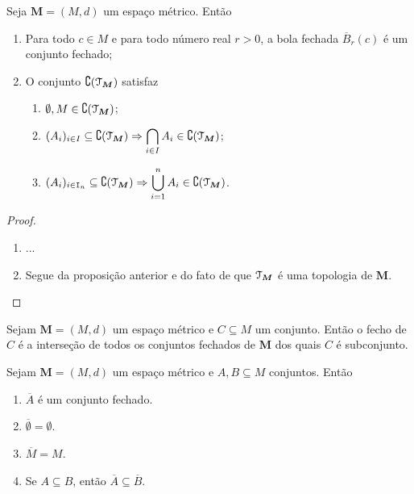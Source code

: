 \begin{prop}
	Seja $\bm M = (M,d)$ um espaço métrico. Então
	\begin{enumerate}
	\item Para todo $c \in M$ e para todo número real $r > 0$, a bola fechada $\overline B_r(c)$ é um conjunto fechado;
	\item O conjunto $\complement(\mathcal{T}_{\bm M})$ satisfaz
		\begin{enumerate}
			\item $\emptyset,M \in \complement(\mathcal{T}_{\bm M})$;
			\item $(A_i)_{i \in I} \subseteq \complement(\mathcal{T}_{\bm M}) \Rightarrow \displaystyle\bigcap_{i \in I} A_i \in \complement(\mathcal{T}_{\bm M})$;
			\item $(A_i)_{i \in \mathtt I_n} \subseteq \complement(\mathcal{T}_{\bm M}) \Rightarrow \displaystyle\bigcup_{i=1}^n A_i \in \complement(\mathcal{T}_{\bm M})$.
		\end{enumerate}
	\end{enumerate}
\end{prop}
\begin{proof}
	\begin{enumerate}
	\item ...
	
	\item Segue da proposição anterior e do fato de que $\mathcal{T}_{\bm M}$ é uma topologia de $\bm M$.
	\end{enumerate}
\end{proof}

\begin{prop}
	Sejam $\bm M = (M,d)$ um espaço métrico e $C \subseteq M$ um conjunto. Então o fecho de $C$ é a interseção de todos os conjuntos fechados de $\bm M$ dos quais $C$ é subconjunto.
\end{prop}

\begin{prop}
	Sejam $\bm M = (M,d)$ um espaço métrico e $A,B \subseteq M$ conjuntos. Então
	\begin{enumerate}
	\item $\overline A$ é um conjunto fechado.
	\item $\overline \emptyset = \emptyset$.
	\item $\overline M = M$.
	\item Se $A \subseteq B$, então $\overline A \subseteq \overline B$.
	\end{enumerate}
\end{prop}

